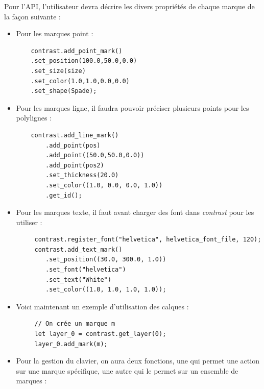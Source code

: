 \documentclass[12pt]{article}
\begin{document}
Pour l'API, l'utilisateur devra décrire les divers propriétés de chaque marque de la façon suivante :
\begin{itemize}
    \item Pour les marques point :

    \begin{verbatim}
    contrast.add_point_mark()
	.set_position(100.0,50.0,0.0)
	.set_size(size)
    .set_color(1.0,1.0,0.0,0.0)
	.set_shape(Spade);
    \end{verbatim}

    \item Pour les marques ligne, il faudra pouvoir préciser plusieurs points pour les polylignes :
    \begin{verbatim}
    contrast.add_line_mark()
		.add_point(pos)
        .add_point((50.0,50.0,0.0))
        .add_point(pos2)
        .set_thickness(20.0)
        .set_color((1.0, 0.0, 0.0, 1.0))
        .get_id();
    \end{verbatim}
    \item Pour les marques texte, il faut avant charger des font dans \textit{contrast} pour les utiliser :
     \begin{verbatim}
     contrast.register_font("helvetica", helvetica_font_file, 120);
     contrast.add_text_mark()
        .set_position((30.0, 300.0, 1.0))
        .set_font("helvetica")
        .set_text("White")
        .set_color((1.0, 1.0, 1.0, 1.0));
    \end{verbatim}
    \item Voici maintenant un exemple d'utilisation des calques :
    \begin{verbatim}
     // On crée un marque m
     let layer_0 = contrast.get_layer(0);
     layer_0.add_mark(m);
    \end{verbatim}
    \item Pour la gestion du clavier, on aura deux fonctions, une qui permet une action sur une marque spécifique, une autre qui le permet sur un ensemble
    de marques :
    \begin{verbatim}

\end{verbatim}
\end{itemize}
\end{document}
